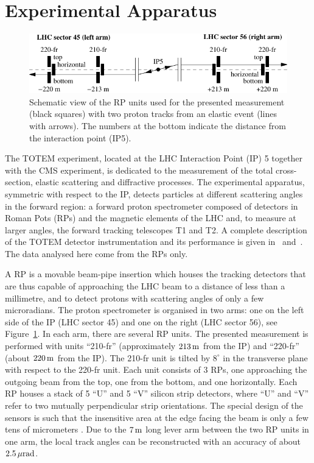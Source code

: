 \section{Experimental Apparatus}
\label{sec:exp apparatus}

\begin{figure}
\begin{center}
\includegraphics{fig/elastic_principle.pdf}
\caption{%
Schematic view of the RP units used for the presented measurement (black squares) with two proton tracks from an elastic event (lines with arrows). The numbers at the bottom indicate the distance from the interaction point (IP5).
}
\label{fig:rpsketch}
\end{center}
\end{figure}

The TOTEM experiment, located at the LHC Interaction Point (IP) 5 together with the CMS experiment, is dedicated to the measurement of the total cross-section, elastic scattering and diffractive processes. The experimental apparatus, symmetric with respect to the IP, detects particles at different scattering angles in the forward region: a forward proton spectrometer composed of detectors in Roman Pots (RPs) and the magnetic elements of the LHC and, to measure at larger angles, the forward tracking telescopes T1 and T2. A complete description of the TOTEM detector instrumentation and its performance is given in~\cite{totem-jinst} and~\cite{totem-ijmp}. The data analysed here come from the RPs only. 

A RP is a movable beam-pipe insertion which houses the tracking detectors that are thus capable of approaching the LHC beam to a distance of less than a millimetre, and to detect protons with scattering angles of only a few microradians. The proton spectrometer is organised in two arms: one on the left side of the IP (LHC sector 45) and one on the right (LHC sector 56), see Figure~\ref{fig:rpsketch}. In each arm, there are several RP units. The presented measurement is performed with units ``210-fr'' (approximately $213\,{\rm m}$ from the IP) and ``220-fr'' (about $220\,{\rm m}$ from the IP). The 210-fr unit is tilted by $8^\circ$ in the transverse plane with respect to the 220-fr unit. Each unit consists of 3 RPs, one approaching the outgoing beam from the top, one from the bottom, and one horizontally. Each RP houses a stack of 5 ``U'' and 5 ``V'' silicon strip detectors, where ``U'' and ``V'' refer to two mutually perpendicular strip orientations. The special design of the sensors is such that the insensitive area at the edge facing the beam is only a few tens of micrometers \cite{edgeless-strips}. Due to the $7\,{\rm m}$ long lever arm between the two RP units in one arm, the local track angles can be reconstructed with an accuracy  of about $2.5\,{\rm \mu rad}$.

